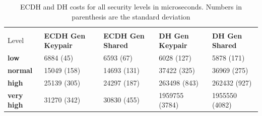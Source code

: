 			\begin{table}[]
			  \begin{tabular}{|l|l|l|l|l|}
			  \hline
			   \backslashbox{Security\\Level}{Operation}                  & \textbf{ECDH Gen Keypair} & \textbf{ECDH Gen Shared} & \textbf{DH Gen Keypair} & \textbf{DH Gen Shared} \\ \hline
			  \textbf{low}       & 6884 (45)                 & 6593 (67)                 & 6028 (127)               & 5878 (171)              \\ \hline
			  \textbf{normal}    & 15049 (158)                & 14693 (131)               & 37422 (325)              & 36969 (275)             \\ \hline
			  \textbf{high}      & 25139 (305)                & 24297 (187)               & 263498 (843)             & 262432 (927)            \\ \hline
			  \textbf{very high} & 31270 (342)                & 30830 (455)               & 1959755 (3784)           & 1955550 (4082)          \\ \hline
			  \end{tabular}
			  \caption{ECDH  and  DH  costs  for  all  security  levels  in  microseconds.  Numbers  in parenthesis are the standard deviation}
			  \label{table:papi-ecd-dh-costs}
			  \end{table}
  
